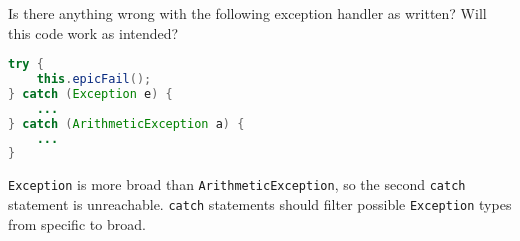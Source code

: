 Is there anything wrong with the following exception handler as written? Will this
code work as intended? 
\begin{lstlisting}[language=java]
try {
	this.epicFail();
} catch (Exception e) {
	...
} catch (ArithmeticException a) {
	...
}
\end{lstlisting}
\begin{answer}
\texttt{Exception} is more broad than \texttt{ArithmeticException}, so the second \texttt{catch} statement is unreachable.  \texttt{catch} statements should filter possible \texttt{Exception} types from specific to broad.
\end{answer}